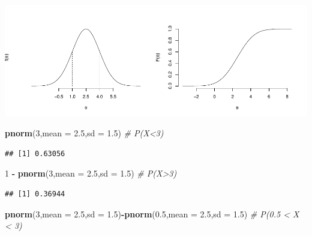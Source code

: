 \documentclass[
  11pt,
]{book}
\newenvironment{Shaded}{\begin{snugshade}}{\end{snugshade}}
\newcommand{\AttributeTok}[1]{\textcolor[rgb]{0.13,0.29,0.53}{#1}}
\newcommand{\CommentTok}[1]{\textcolor[rgb]{0.56,0.35,0.01}{\textit{#1}}}
\newcommand{\DecValTok}[1]{\textcolor[rgb]{0.00,0.00,0.81}{#1}}
\newcommand{\FloatTok}[1]{\textcolor[rgb]{0.00,0.00,0.81}{#1}}
\newcommand{\FunctionTok}[1]{\textcolor[rgb]{0.13,0.29,0.53}{\textbf{#1}}}
\newcommand{\NormalTok}[1]{#1}
\newcommand{\SpecialCharTok}[1]{\textcolor[rgb]{0.81,0.36,0.00}{\textbf{#1}}}
\theoremstyle{mytheoremstyle}
\theoremstyle{mydefstyle}
\begin{document}
\begin{center}\includegraphics{Appunti_di_Statistica_2025_files/figure-latex/24-Libro-42-1} \end{center}

\begin{Shaded}
\begin{Highlighting}[]
\FunctionTok{pnorm}\NormalTok{(}\DecValTok{3}\NormalTok{,}\AttributeTok{mean =} \FloatTok{2.5}\NormalTok{,}\AttributeTok{sd =} \FloatTok{1.5}\NormalTok{)      }\CommentTok{\# P(X\textless{}3)}
\end{Highlighting}
\end{Shaded}

\begin{verbatim}
## [1] 0.63056
\end{verbatim}

\begin{Shaded}
\begin{Highlighting}[]
\DecValTok{1} \SpecialCharTok{{-}} \FunctionTok{pnorm}\NormalTok{(}\DecValTok{3}\NormalTok{,}\AttributeTok{mean =} \FloatTok{2.5}\NormalTok{,}\AttributeTok{sd =} \FloatTok{1.5}\NormalTok{)  }\CommentTok{\# P(X\textgreater{}3)}
\end{Highlighting}
\end{Shaded}

\begin{verbatim}
## [1] 0.36944
\end{verbatim}

\begin{Shaded}
\begin{Highlighting}[]
\FunctionTok{pnorm}\NormalTok{(}\DecValTok{3}\NormalTok{,}\AttributeTok{mean =} \FloatTok{2.5}\NormalTok{,}\AttributeTok{sd =} \FloatTok{1.5}\NormalTok{)}\SpecialCharTok{{-}}\FunctionTok{pnorm}\NormalTok{(}\FloatTok{0.5}\NormalTok{,}\AttributeTok{mean =} \FloatTok{2.5}\NormalTok{,}\AttributeTok{sd =} \FloatTok{1.5}\NormalTok{) }\CommentTok{\#  P(0.5 \textless{} X \textless{} 3)}
\end{Highlighting}
\end{Shaded}
\end{document}
